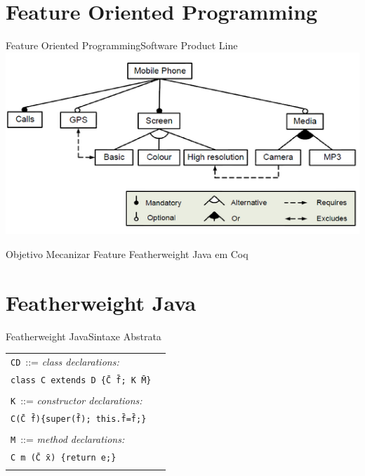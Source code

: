 \documentclass{beamer}
\newcommand{\cdecl}[6]{\texttt{class #1 extends #2 \{\={#3} \={#4}; #5 \={#6}\}}}
\newcommand{\mdecl}[5]{\texttt{#1 #2 (\={#3} \={#4}) \{return #5;\}}}
\begin{document}
    \section{Feature Oriented Programming}
    \begin{frame}{Feature Oriented Programming}{Software Product Line}
        \includegraphics[width=\textwidth]{spl-ex}
    \end{frame}

    \begin{frame}{Objetivo}
        \centering
        Mecanizar Feature Featherweight Java em Coq
    \end{frame}

    \section{Featherweight Java}
    \begin{frame}{Featherweight Java}{Sintaxe Abstrata}
        \begin{table}[!ht]
            \centering
            \begin{tabular}{lr}
                \texttt{CD}~::= \hfill \textit{class declarations:}\\
                \quad \cdecl{C}{D}{C}{f}{K}{M} \\  \\
                \texttt{K}~::=  \hfill\textit{constructor declarations:}\\
                \quad \texttt{C(\={C}~\={f})\{super(\={f});~this.\={f}=\={f};\}}\\\\
                \texttt{M}~::= \hfill\textit{method declarations:}\\
                \quad \mdecl{C}{m}{C}{x}{e} \\ \\
            \end{tabular}
            \quad
            \label{abstractsyntax}
        \end{table}
    \end{frame}
\end{document}
